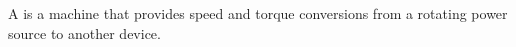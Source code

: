 \begin{module}[id=transmission]
  \begin{definition}
    A  is a machine that provides speed and torque conversions from a
    rotating power source to another device.
  \end{definition}
\end{module}

